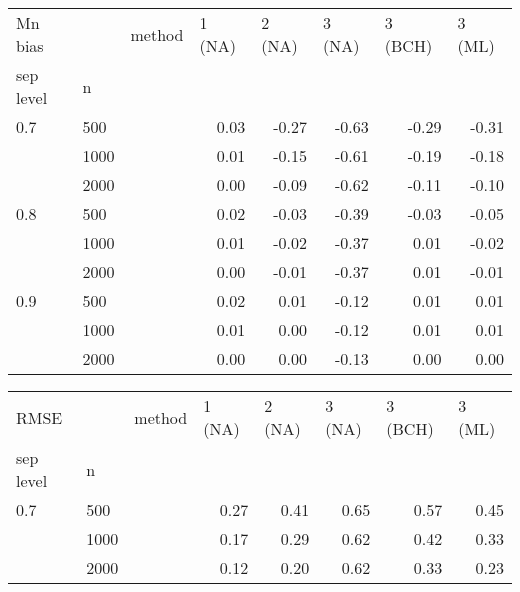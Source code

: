 \documentclass{article}
\begin{document}
\begin{table}[ht]
\centering
\begin{tabular}{lll |rrrrr}
  \hline
Mn bias    &      & method & \multicolumn{1}{l}{ 1 (NA)} & \multicolumn{1}{l}{ 2 (NA)} & \multicolumn{1}{l}{ 3 (NA)} & \multicolumn{1}{l}{ 3 (BCH)} & \multicolumn{1}{l}{ 3 (ML)} \\ 
  sep level & n    &        & \multicolumn{1}{l}{       } & \multicolumn{1}{l}{       } & \multicolumn{1}{l}{       } & \multicolumn{1}{l}{        } & \multicolumn{1}{l}{       } \\ 
   \hline
0.7       & 500  &        &   0.03 &  -0.27 &  -0.63 &   -0.29 &  -0.31 \\ 
            & 1000 &        &   0.01 &  -0.15 &  -0.61 &   -0.19 &  -0.18 \\ 
            & 2000 &        &   0.00 &  -0.09 &  -0.62 &   -0.11 &  -0.10 \\ 
  0.8       & 500  &        &   0.02 &  -0.03 &  -0.39 &   -0.03 &  -0.05 \\ 
            & 1000 &        &   0.01 &  -0.02 &  -0.37 &    0.01 &  -0.02 \\ 
            & 2000 &        &   0.00 &  -0.01 &  -0.37 &    0.01 &  -0.01 \\ 
  0.9       & 500  &        &   0.02 &   0.01 &  -0.12 &    0.01 &   0.01 \\ 
            & 1000 &        &   0.01 &   0.00 &  -0.12 &    0.01 &   0.01 \\ 
            & 2000 &        &   0.00 &   0.00 &  -0.13 &    0.00 &   0.00 \\ 
   \hline
\end{tabular}
\begin{tabular}{lll |rrrrr}
  \hline
RMSE        &      & method & \multicolumn{1}{l}{ 1 (NA)} & \multicolumn{1}{l}{ 2 (NA)} & \multicolumn{1}{l}{ 3 (NA)} & \multicolumn{1}{l}{ 3 (BCH)} & \multicolumn{1}{l}{ 3 (ML)} \\ 
  sep level & n    &        & \multicolumn{1}{l}{       } & \multicolumn{1}{l}{       } & \multicolumn{1}{l}{       } & \multicolumn{1}{l}{        } & \multicolumn{1}{l}{       } \\ 
   \hline
0.7       & 500  &        &   0.27 &   0.41 &   0.65 &    0.57 &   0.45 \\ 
            & 1000 &        &   0.17 &   0.29 &   0.62 &    0.42 &   0.33 \\ 
            & 2000 &        &   0.12 &   0.20 &   0.62 &    0.33 &   0.23 \\ 

\end{tabular}
\end{table}
\end{document}
